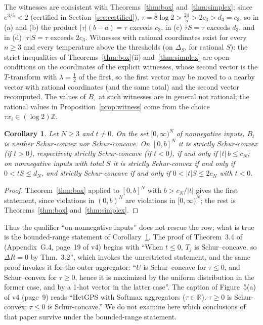 \documentclass[11pt,a4paper]{article}
\theoremstyle{plain}
\newtheorem{corollary}[theorem]{Corollary}
\theoremstyle{definition}
\newcommand{\Simp}{\Delta}
\begin{document}
The witnesses are consistent with Theorems~\ref{thm:box} and~\ref{thm:simplex}: since $e^{3/5}<2$ (certified in Section~\ref{sec:certified}), $\tau=8\log 2>\tfrac{24}{5}>2c_3>d_3=c_3$, so in (a) and (b) the product $|\tau|(b-a)=\tau$ exceeds $c_3$, in (c) $\tau S=\tau$ exceeds $d_3$, and in (d) $|\tau|S=\tau$ exceeds $2c_3$. Witnesses with rational coordinates exist for every $n\ge 3$ and every temperature above the thresholds (on $\Simp_S$, for rational $S$): the strict inequalities of Theorems~\ref{thm:box}(ii) and~\ref{thm:simplex} are open conditions on the coordinates of the explicit witnesses, whose second vector is the $T$-transform with $\lambda=\frac12$ of the first, so the first vector may be moved to a nearby vector with rational coordinates (and the same total) and the second vector recomputed. The values of $B_\tau$ at such witnesses are in general not rational; the rational values in Proposition~\ref{prop:witness} come from the choice $\tau x_i\in(\log 2)\mathbb{Z}$.

\begin{corollary}\label{cor:nonneg}
Let $N\ge 3$ and $t\ne 0$. On the set $[0,\infty)^N$ of nonnegative inputs, $B_t$ is neither Schur-convex nor Schur-concave. On $[0,b]^N$ it is strictly Schur-convex (if $t>0$), respectively strictly Schur-concave (if $t<0$), if and only if $|t|\,b\le c_N$; on nonnegative inputs with total $S$ it is strictly Schur-convex if and only if $0<tS\le d_N$, and strictly Schur-concave if and only if $0<|t|S\le 2c_N$ with $t<0$.
\end{corollary}

\begin{proof}
Theorem~\ref{thm:box} applied to $[0,b]^N$ with $b>c_N/|t|$ gives the first statement, since violations in $(0,b)^N$ are violations in $[0,\infty)^N$; the rest is Theorems~\ref{thm:box} and~\ref{thm:simplex}.
\end{proof}

Thus the qualifier ``on nonnegative inputs'' does not rescue the row; what is true is the bounded-range statement of Corollary~\ref{cor:nonneg}. The proof of Theorem~3.4 of \cite{AmirBettiniProrok2026} (Appendix~G.4, page~19 of v4) begins with ``When $t\le 0$, $T_j$ is Schur--concave, so $\Delta R=0$ by Thm.~3.2'', which invokes the unrestricted statement, and the same proof invokes it for the outer aggregator: ``$U$ is Schur--concave for $\tau\le 0$, and Schur--convex for $\tau\ge 0$, hence it is maximized by the uniform distribution in the former case, and by a 1-hot vector in the latter case''. The caption of Figure~5(a) of v4 (page~9) reads ``HetGPS with Softmax aggregators ($\tau\in\mathbb{R}$). $\tau\ge 0$ is Schur-convex; $\tau\le 0$ is Schur-concave.'' We do not examine here which conclusions of that paper survive under the bounded-range statement.
\end{document}
